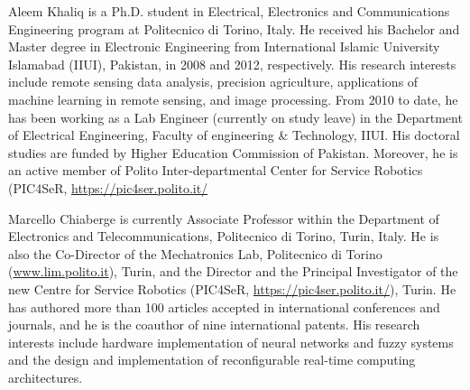 \documentclass[journal]{IEEEtran}
\begin{document}
\begin{IEEEbiography}{Aleem Khaliq} is a Ph.D. student in Electrical, Electronics and Communications Engineering program at Politecnico di Torino, Italy. He received his Bachelor and Master degree in Electronic Engineering from International Islamic University Islamabad (IIUI), Pakistan, in 2008 
and 2012, respectively. His research interests include remote sensing data analysis, precision agriculture, applications of machine learning in remote sensing, and image processing.  
From 2010 to date, he has been working as a Lab Engineer (currently on study leave) in the Department of Electrical Engineering, Faculty of engineering \& Technology, IIUI. His doctoral studies are funded by Higher Education Commission of Pakistan. Moreover, he is an active member of Polito Inter-departmental Center for Service Robotics (PIC4SeR, \url{https://pic4ser.polito.it/} 
\end{IEEEbiography}


\begin{IEEEbiography}{Marcello Chiaberge} is currently Associate Professor within the Department of Electronics and Telecommunications, Politecnico di Torino, Turin, Italy. He is also the Co-Director of the Mechatronics Lab, Politecnico di Torino
(\url{www.lim.polito.it}), Turin, and the Director and the Principal Investigator of the new Centre for Service Robotics (PIC4SeR, \url{https://pic4ser.polito.it/}), Turin. He has authored more than 100 articles accepted in international conferences and journals,
and he is the coauthor of nine international patents. His research interests include
hardware implementation of neural networks and fuzzy systems and the design and implementation of reconfigurable real-time computing architectures. \end{IEEEbiography}
\vfill
\end{document}

